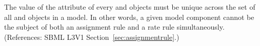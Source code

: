The value of the attribute  of every \AssignmentRule and
\RateRule objects must be unique across the set of all \AssignmentRule and
\RateRule objects in a model.  In other words, a given model component
cannot be the subject of both an assignment rule and a rate rule
simultaneously.  (References: SBML L3V1 Section~\ref{sec:assignmentrule}.)
